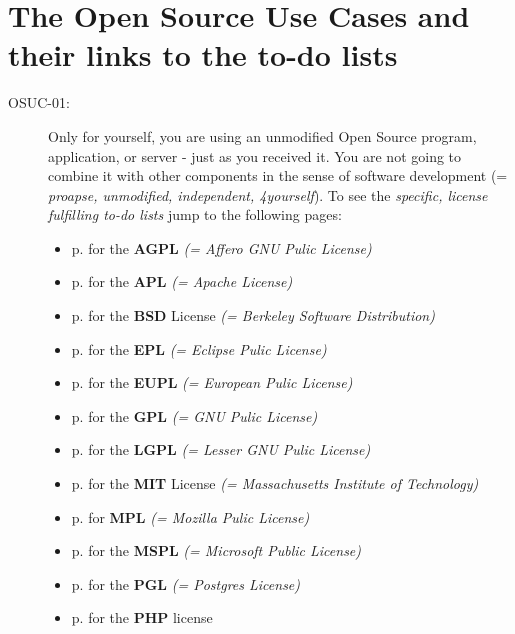 \section{The Open Source Use Cases and their links to the to-do lists}

\begin{description}

\item[OSUC-01:]\label{OSUC-01-DEF}
Only for yourself, you are using an unmodified Open Source program, application,
or server - just as you received it. You are not going to combine it with other
components in the sense of software development (= \textit{proapse, unmodified,
independent, 4yourself}). 
To see the \textit{specific, license fulfilling to-do lists} jump to the
following pages:
  \begin{itemize}
    \item p. \pageref{OSUC-01-AGPL} for the \textbf{AGPL}
      \textit{(= Affero GNU Pulic License)} 
    \item p. \pageref{OSUC-01-Apache20} for the \textbf{APL}
      \textit{(= Apache License)}
    \item p. \pageref{OSUC-01-BSD} for the \textbf{BSD} License
      \textit{(= Berkeley Software Distribution)}
    \item p. \pageref{OSUC-01-EPL} for the \textbf{EPL}
      \textit{(= Eclipse Pulic License)}     
    \item p. \pageref{OSUC-01-EUPL} for the \textbf{EUPL}
      \textit{(= European Pulic License)} 
    \item p. \pageref{OSUC-01-GPL} for the \textbf{GPL}
       \textit{(= GNU Pulic License)} 
    \item p. \pageref{OSUC-01-LGPL} for the \textbf{LGPL}
      \textit{(= Lesser GNU Pulic License)}           
    \item p. \pageref{OSUC-01-MIT} for the \textbf{MIT} License
       \textit{(= Massachusetts Institute of Technology)} 
    \item p. \pageref{OSUC-01-MPL} for \textbf{MPL}
      \textit{(= Mozilla Pulic License)}     
    \item p. \pageref{OSUC-01-MsPL} for the \textbf{MSPL}
      \textit{(= Microsoft Public License)} 
    \item p. \pageref{OSUC-01-PGL} for the \textbf{PGL}
      \textit{(= Postgres License)} 
    \item p. \pageref{OSUC-01-PHP} for the \textbf{PHP} license 
  \end{itemize}


\end{description}
